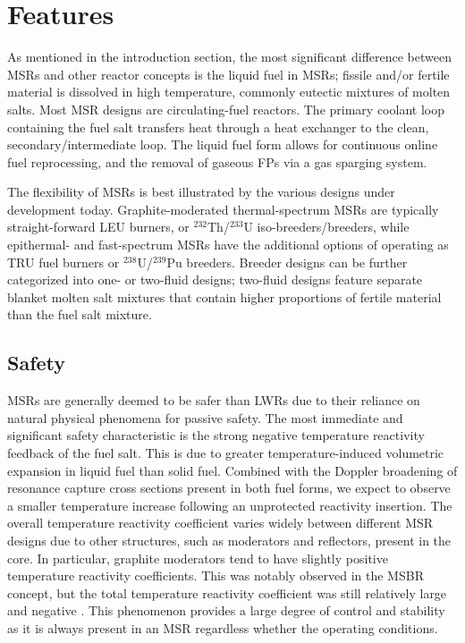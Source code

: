 \section{Features}

As mentioned in the introduction section, the most significant difference
between \glspl{MSR} and other reactor concepts is the liquid fuel in
\glspl{MSR}; fissile and/or fertile material is dissolved in high temperature,
commonly eutectic mixtures of molten salts. Most \gls{MSR} designs are
circulating-fuel reactors. The primary coolant loop containing the fuel salt
transfers heat through a heat exchanger to the clean, secondary/intermediate
loop. The liquid fuel form allows for continuous online fuel reprocessing,
and the removal of gaseous \glspl{FP} via a gas sparging system.

The flexibility of \glspl{MSR} is best illustrated by the various designs
under development today. Graphite-moderated thermal-spectrum \glspl{MSR} are
typically straight-forward \gls{LEU} burners, or $^{232}$Th/$^{233}$U
iso-breeders/breeders, while epithermal- and fast-spectrum \glspl{MSR} have
the additional options of operating as \gls{TRU} fuel burners or
$^{238}$U/$^{239}$Pu breeders. Breeder designs can be further categorized into
one- or two-fluid designs; two-fluid designs feature separate blanket molten
salt mixtures that contain higher proportions of fertile material than the
fuel salt mixture.

\subsection{Safety}

\glspl{MSR} are generally deemed to be safer than \glspl{LWR} due to their
reliance on natural physical phenomena for passive safety.
The most immediate and significant safety characteristic is the strong
negative temperature reactivity feedback of the fuel salt. This is due to
greater temperature-induced volumetric expansion in liquid fuel than solid
fuel. Combined with the Doppler broadening of resonance capture cross sections
present in both fuel forms, we expect to observe a smaller temperature
increase following an unprotected reactivity insertion. The overall
temperature reactivity coefficient varies widely between different \gls{MSR}
designs due to other structures, such as moderators and reflectors, present in
the core. In particular, graphite moderators tend to have slightly positive
temperature reactivity coefficients. This was notably observed in the
\gls{MSBR} concept, but the total temperature reactivity coefficient was still
relatively large and negative \cite{rykhlevskii_modeling_2019}. This
phenomenon provides a large degree of control and stability as it is always
present in an \gls{MSR} regardless whether the operating conditions.

